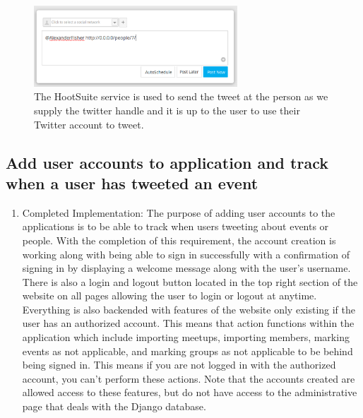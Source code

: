 \documentclass[draftclsnofoot,10pt,onecolumn]{IEEEtran} %
\begin{document}
\begin{enumerate}[label*=\arabic*.]
\begin{figure}[H]
\begin{center}
  \end{center}
\end{figure}

\begin{figure}[H]
  \begin{center}
  
  \includegraphics[width=3in, frame]{tweet_person2}
  	\captionsetup{width=.4\linewidth}
  \centering
  \caption{The HootSuite service is used to send the tweet at the person as we supply the twitter handle and it is up to the user to use their Twitter account to tweet.}

  \end{center}
\end{figure}

\end{enumerate}

\subsection{Add user accounts to application and track when a user has tweeted an event}
\begin{enumerate}[label*=\arabic*.]
  \item Completed Implementation: The purpose of adding user accounts to the applications
    is to be able to track when users tweeting about events or people. With the completion
    of this requirement, the account creation is working along with being able to sign in 
    successfully with a confirmation of signing in by displaying a welcome message along with
    the user's username. There is also a login and logout button located in the
    top right section of the website on all pages allowing the user to login or
    logout at anytime. Everything is also backended with features of the website only existing
    if the user has an authorized account. This means that action functions within the application
    which include importing meetups, importing members, marking events as not
    applicable, and marking groups as not applicable to be behind being signed in.
    This means if you are not logged in with the authorized account, you can't perform these 
    actions. Note that the accounts created are allowed access to these features, but do not
    have access to the administrative page that deals with the Django database.

\end{enumerate}
\end{document}
